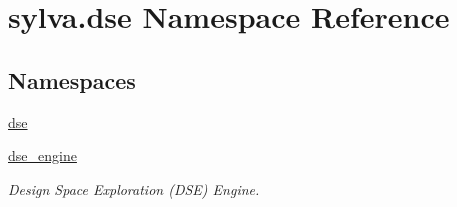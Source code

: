 \hypertarget{namespacesylva_1_1dse}{}\section{sylva.\+dse Namespace Reference}
\label{namespacesylva_1_1dse}
\subsection*{Namespaces}
\begin{DoxyCompactItemize}
\item 
 \hyperlink{namespacesylva_1_1dse_1_1dse}{dse}
\item 
 \hyperlink{namespacesylva_1_1dse_1_1dse__engine}{dse\+\_\+engine}
\begin{DoxyCompactList}\small\item\em Design Space Exploration (D\+SE) Engine. \end{DoxyCompactList}\end{DoxyCompactItemize}
